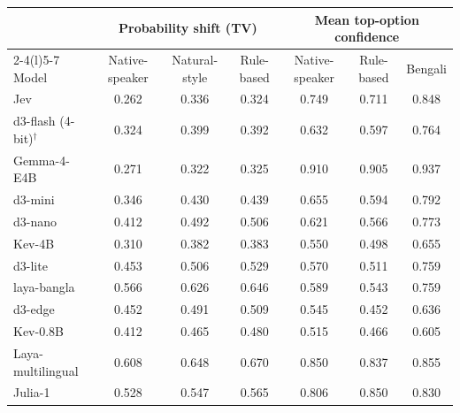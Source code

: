 \begin{tabular}{@{}lcccccc@{}}\toprule
 & \multicolumn{3}{c}{Probability shift (TV)} & \multicolumn{3}{c}{Mean top-option confidence} \\\cmidrule(lr){2-4}\cmidrule(l){5-7}
Model & Native-speaker & Natural-style & Rule-based & Native-speaker & Rule-based & Bengali \\\midrule
Jev & 0.262 & 0.336 & 0.324 & 0.749 & 0.711 & 0.848 \\
d3-flash (4-bit)$^\dagger$ & 0.324 & 0.399 & 0.392 & 0.632 & 0.597 & 0.764 \\
Gemma-4-E4B & 0.271 & 0.322 & 0.325 & 0.910 & 0.905 & 0.937 \\
d3-mini & 0.346 & 0.430 & 0.439 & 0.655 & 0.594 & 0.792 \\
d3-nano & 0.412 & 0.492 & 0.506 & 0.621 & 0.566 & 0.773 \\
Kev-4B & 0.310 & 0.382 & 0.383 & 0.550 & 0.498 & 0.655 \\
d3-lite & 0.453 & 0.506 & 0.529 & 0.570 & 0.511 & 0.759 \\
laya-bangla & 0.566 & 0.626 & 0.646 & 0.589 & 0.543 & 0.759 \\
d3-edge & 0.452 & 0.491 & 0.509 & 0.545 & 0.452 & 0.636 \\
Kev-0.8B & 0.412 & 0.465 & 0.480 & 0.515 & 0.466 & 0.605 \\
Laya-multilingual & 0.608 & 0.648 & 0.670 & 0.850 & 0.837 & 0.855 \\
Julia-1 & 0.528 & 0.547 & 0.565 & 0.806 & 0.850 & 0.830 \\
\bottomrule\end{tabular}
